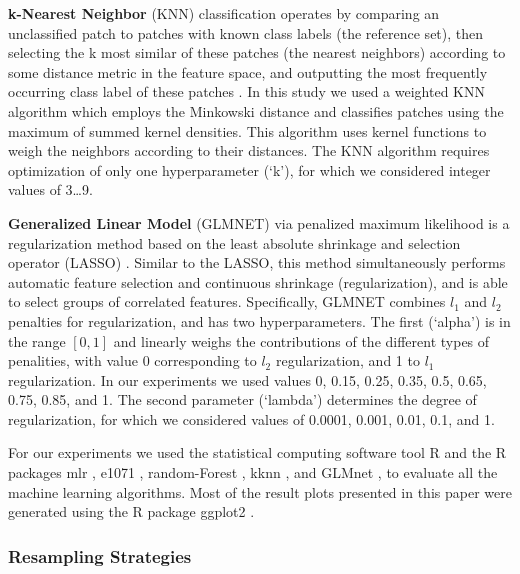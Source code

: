 {\bf k-Nearest Neighbor} (KNN) classification operates by comparing an unclassified patch to patches with known class labels (the reference set), then selecting the k most similar of these patches (the nearest neighbors) according to some distance metric in the feature space, and outputting the most frequently occurring class label of these patches \cite{1053964}. In this study we used a weighted KNN algorithm \cite{Hechenbichler06weightedk-nearest-neighbor, citeulike:13121917} which employs the Minkowski distance and classifies patches using the maximum of summed kernel densities. This algorithm uses kernel functions to weigh the neighbors according to their distances. The KNN algorithm requires optimization of only one hyperparameter (`k'), for which we considered integer values of 3\dots9.

{\bf Generalized Linear Model} (GLMNET) via penalized maximum likelihood \cite{glmnet} is a regularization method based on the least absolute shrinkage and selection operator (LASSO) \cite{Tibshirani96regressionshrinkage}. Similar to the LASSO, this method simultaneously performs automatic feature selection and continuous shrinkage (regularization), and is able to select groups of correlated features. Specifically, {\color{red} GLMNET combines $l_1$ and $l_2$ penalties for regularization, and has two hyperparameters.} The first (`alpha') is in the range $[0,1]$ and linearly weighs the contributions of the different types of penalities, with value 0 corresponding to $l_2$ regularization, and 1 to $l_1$ regularization. In our experiments we used values 0, 0.15, 0.25, 0.35, 0.5, 0.65, 0.75, 0.85, and 1. The second parameter (`lambda') determines the degree of regularization, for which we considered values of 0.0001, 0.001, 0.01, 0.1, and 1.

For our experiments we used the statistical computing software tool R \cite{Rpackage2016} and the R packages mlr \cite{mlrpackage2016}, e1071 \cite{e1071}, random-Forest \cite{randomForest}, kknn \cite{kknn}, and GLMnet \cite{glmnet}, to evaluate all the machine learning algorithms. Most of the result plots presented in this paper were generated using the R package ggplot2 \cite{Wickham-2009}.

\subsubsection{Resampling Strategies}
\label{subsubsec:resampling}

